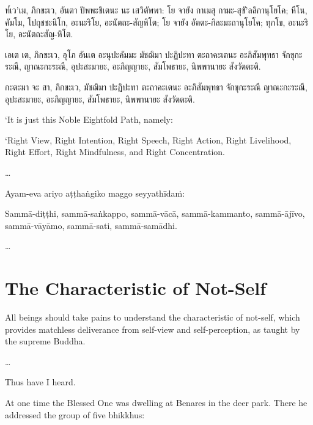 ท๎เว’เม, ภิกขะเว, อันตา ปัพพะชิเตนะ นะ เสวิตัพพา: โย จายัง กาเมสุ
กามะ-สุขั’ลลิกานุโยโค; หีโน, คัมโม, โปถุชชะนิโก, อะนะริโย, อะนัตถะ-สัญหิโต; โย จายัง อัตตะ-กิละมะถานุโยโค; ทุกโข, อะนะริโย, อะนัตถะสัญ-หิโต.

เอเต เต, ภิกขะเว, อุโภ อันเต อะนุปะคัมมะ มัชฌิมา ปะฏิปะทา ตะถาคะเตนะ อะภิสัมพุทธา จักขุกะระณี, ญาณะกะระณี, อุปะสะมายะ, อะภิญญายะ, สัมโพธายะ, นิพพานายะ สังวัตตะติ.

กะตะมา จะ สา, ภิกขะเว, มัชฌิมา ปะฏิปะทา ตะถาคะเตนะ อะภิสัมพุทธา จักขุกะระณี ญาณะกะระณี, อุปะสะมายะ, อะภิญญายะ, สัมโพธายะ, นิพพานายะ สังวัตตะติ.

\clearpage

\englishText
\markboth{\englishTitle}{\rightmark}

‘It is just this Noble Eightfold Path, namely:

‘Right View, Right Intention, Right Speech, Right Action, Right
Livelihood, Right Effort, Right Mindfulness, and Right Concentration.

\ldots{}

\clearpage

\paliText
\markboth{\paliTitle}{\rightmark}

Ayam-eva ariyo aṭṭhaṅgiko maggo seyyathīdaṁ:

Sammā-diṭṭhi, sammā-saṅkappo, sammā-vācā, sammā-kammanto, sammā-ājīvo,
sammā-vāyāmo, sammā-sati, sammā-samādhi.

\ldots{}

\chapterTocDelegatePageNumber
\chapter{The Characteristic of Not-Self}

\setTocDelegatedPageNumber
\englishText
\renewcommand{\englishTitle}{The Characteristic of Not-Self}

\begin{leader}

All beings should take pains to understand the characteristic of
not-self, which provides matchless deliverance from self-view and
self-perception, as taught by the supreme Buddha.

\ldots{}

\end{leader}

Thus have I heard.

At one time the Blessed One was dwelling at Benares in the deer park.
There he addressed the group of five bhikkhus:


